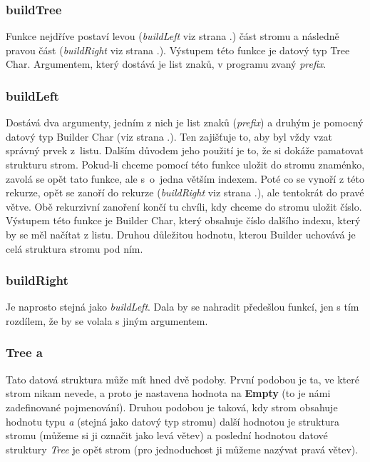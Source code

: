 \documentclass[12pt,a4paper]{report}
\begin{document}
\subsubsection{buildTree} \label{buildTree}
Funkce nejdříve postaví levou (\textit{buildLeft} viz strana \pageref{buildLeft}.) část stromu a následně pravou část  (\textit{buildRight} viz strana \pageref{buildRight}.). Výstupem této funkce je datový typ Tree Char. Argumentem, který dostává je list znaků, v programu zvaný \textit{prefix}.

\subsubsection{buildLeft} \label{buildLeft}
Dostává dva argumenty, jedním z nich je list znaků (\textit{prefix}) a druhým je pomocný datový typ Builder Char (viz strana \pageref{Builder}.). Ten zajišťuje to, aby byl vždy vzat správný prvek z~listu. Dalším důvodem jeho použití je to, že si dokáže pamatovat strukturu strom. Pokud-li chceme pomocí této funkce uložit do stromu znaménko, zavolá se opět tato funkce, ale s~o~jedna větším indexem. Poté co se vynoří z této rekurze, opět se zanoří do rekurze (\textit{buildRight} viz strana \pageref{buildRight}.), ale tentokrát do pravé větve. Obě rekurzivní zanoření končí tu chvíli, kdy chceme do stromu uložit číslo. 
Výstupem této funkce je Builder Char, který obsahuje číslo dalšího indexu, který by se měl načítat z listu. Druhou důležitou hodnotu, kterou Builder uchovává je celá struktura stromu pod ním.   
\subsubsection{buildRight} \label{buildRight}
Je naprosto stejná jako \textit{buildLeft}. Dala by se nahradit předešlou funkcí, jen s tím rozdílem, že by se volala s jiným argumentem. 
\subsubsection{Tree a}
Tato datová struktura může mít hned dvě podoby. První podobou je ta, ve které strom nikam nevede, a proto je nastavena hodnota na \textbf{Empty} (to je námi zadefinované pojmenování). Druhou podobou je taková, kdy strom obsahuje hodnotu typu \textit{a} (stejná jako datový typ stromu) další hodnotou je struktura stromu (můžeme si ji označit jako levá větev) a poslední hodnotou datové struktury \textit{Tree} je opět strom (pro jednoduchost ji můžeme nazývat pravá větev).
\end{document}
